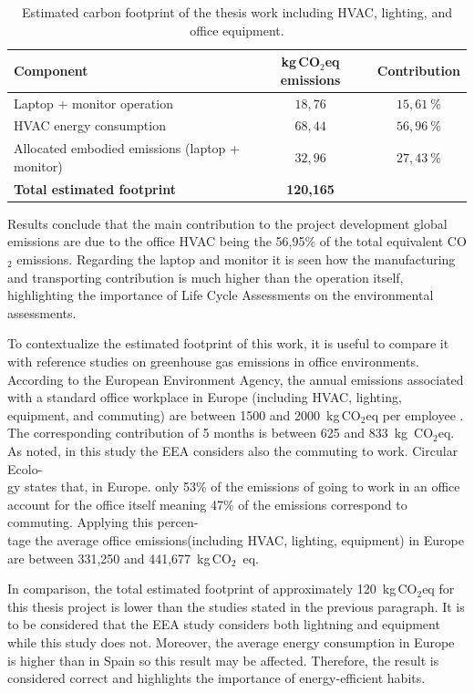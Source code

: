 \begin{table}[H]
\centering
\caption{Estimated carbon footprint of the thesis work including HVAC, lighting, and office equipment.}
\label{tab:contribution_CO2}
\renewcommand{\arraystretch}{1.15}
\small
\begin{tabular}{|l|c|c|}
\hline
\textbf{Component} & \textbf{kg\,CO$_2$eq emissions } & \textbf{Contribution} \\ 
\hline
Laptop + monitor operation & $18,76$ & $15,61~\%$ \\ 
HVAC energy consumption & $68,44$ & $56,96~\%$ \\ 
Allocated embodied emissions (laptop + monitor) & $32,96$ & $27,43~\%$ \\ 
\hline
\textbf{Total estimated footprint} & \textbf{120,165} &  \\ 
\hline
\end{tabular}
\end{table}

Results conclude that the main contribution to the project development global emissions are due to the office HVAC being the 56,95\% of 
the total equivalent CO$_2$ emissions. Regarding the laptop and monitor it is seen how the manufacturing and transporting contribution
is much higher than the operation itself, highlighting the importance of Life Cycle Assessments on the environmental assessments.

To contextualize the estimated footprint of this work, it is useful to compare it with reference studies on greenhouse gas emissions 
in office environments. 
According to the European Environment Agency, the annual emissions associated with a standard office workplace in 
Europe (including HVAC, lighting, equipment, and commuting) are between 1500 and 2000~kg\,CO$_2$eq per employee \cite{EEA2021OfficeEnergy}. The corresponding contribution
of 5 months is  between 625 and 833~kg \,CO$_2$eq. As noted, in this study the EEA considers also the commuting to work. Circular Ecolo-\\gy \cite{CircularEcology} states that, in Europe. only 53\%
of the emissions of going to work in an office account for the office itself meaning 47\% of the emissions correspond to commuting. Applying this percen-\\tage
the average office emissions(including HVAC, lighting, equipment) in Europe are between 331,250 and 441,677~kg\,CO$_2$~eq.

In comparison, the total estimated footprint of approximately 120~kg\,CO$_2$eq for this thesis project is lower than the studies stated in the previous paragraph.
It is to be considered that the EEA study considers both lightning and equipment while this study does not. Moreover, the average energy consumption in Europe is
higher than in Spain so this result may be affected. Therefore, the result is considered correct and highlights the importance of energy-efficient habits.






